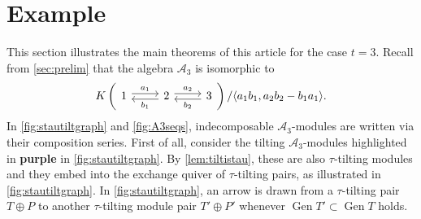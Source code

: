 \documentclass[10pt,twoside, a4paper,reqno]{amsart}
\DeclareMathOperator{\Gen}{Gen}
\newcommand{\A}{\mathscr{A}}
\theoremstyle{definition}
\begin{document}
\section{Example}\label{sec:example}
This section illustrates the main theorems of this article for the case $t=3$. Recall from \cref{sec:prelim} that the algebra $\A_3$ is isomorphic to 
\[ K \left( \begin{tikzcd} 1 \arrow[r, "a_1", shift left] & 2 \arrow[r, "a_2", shift left] \arrow[l, "b_1", shift left] & 3 \arrow[l, "b_2", shift left] \end{tikzcd} \right) / \langle a_1 b_1, a_2b_2 - b_1a_1 \rangle . \]
In \cref{fig:stautiltgraph} and \cref{fig:A3seqs}, indecomposable $\A_3$-modules are written via their composition series. First of all, consider the tilting $\A_3$-modules highlighted in {\color{purple} \textbf{purple}} in \cref{fig:stautiltgraph}. By \cref{lem:tiltistau}, these are also $\tau$-tilting modules and they embed into the exchange quiver of $\tau$-tilting pairs, as illustrated in \cref{fig:stautiltgraph}. In \cref{fig:stautiltgraph}, an arrow is drawn from a $\tau$-tilting pair $T \oplus P$ to another $\tau$-tilting module pair $T' \oplus P'$ whenever $\Gen T'  \subset \Gen T$ holds. 
\end{document}
